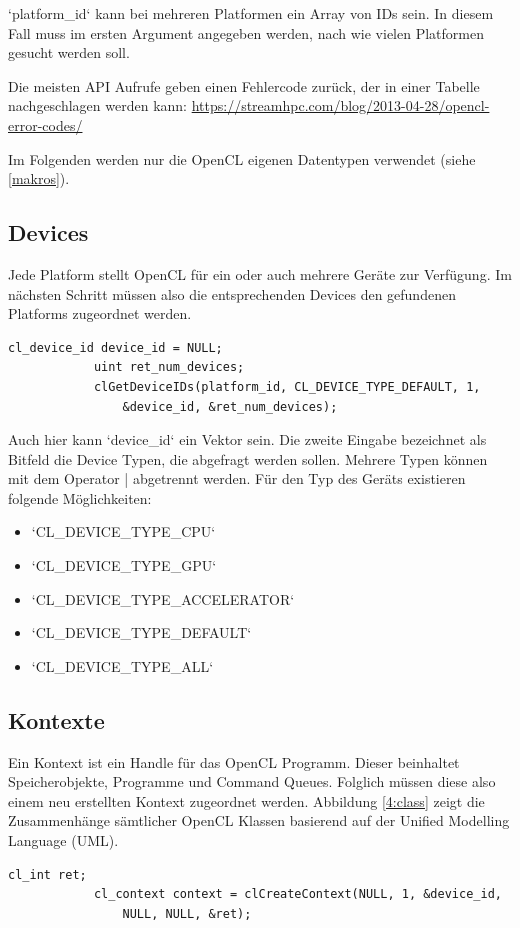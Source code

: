			\li`platform_id` kann bei mehreren Platformen ein Array von IDs sein. In diesem Fall muss im ersten Argument angegeben werden, nach wie vielen Platformen gesucht werden soll.
			
			Die meisten \Gls{API} Aufrufe geben einen Fehlercode zurück, der in einer Tabelle nachgeschlagen werden kann: \url{https://streamhpc.com/blog/2013-04-28/opencl-error-codes/}
			
			Im Folgenden werden nur die OpenCL eigenen Datentypen verwendet (siehe \ref{makros}).
							
			\subsection{Devices}
			Jede \Gls{Platform} stellt OpenCL für ein oder auch mehrere Geräte zur Verfügung. Im nächsten Schritt müssen also die entsprechenden Devices den gefundenen \Glspl{Platform} zugeordnet werden.		
			\begin{lstlisting}[caption=Deviceabfrage]
			cl_device_id device_id = NULL;	
			uint ret_num_devices;
			clGetDeviceIDs(platform_id, CL_DEVICE_TYPE_DEFAULT, 1, 
				&device_id, &ret_num_devices);
			\end{lstlisting}
			
			Auch hier kann \li`device_id` ein Vektor sein. Die zweite Eingabe bezeichnet als Bitfeld die Device Typen, die abgefragt werden sollen. Mehrere Typen können mit dem Operator | abgetrennt werden. Für den Typ des Geräts existieren folgende Möglichkeiten:
						
			\begin{itemize}		
			\item \li`CL_DEVICE_TYPE_CPU`	
			\item \li`CL_DEVICE_TYPE_GPU`		
			\item \li`CL_DEVICE_TYPE_ACCELERATOR`		
			\item \li`CL_DEVICE_TYPE_DEFAULT`			
			\item \li`CL_DEVICE_TYPE_ALL`
			\end{itemize}
				
			\subsection{Kontexte}
			Ein \Gls{Kontext} ist ein \Gls{Handle} für das OpenCL Programm. Dieser beinhaltet Speicherobjekte, Programme und Command Queues. Folglich müssen diese also einem neu erstellten \Gls{Kontext} zugeordnet werden. Abbildung \ref{4:class} zeigt die Zusammenhänge sämtlicher OpenCL Klassen \autocite{oclRC} basierend auf der Unified Modelling Language (UML). \autocite{uml}
			\begin{lstlisting}[caption=Kontexte]
			cl_int ret;
			cl_context context = clCreateContext(NULL, 1, &device_id, 
				NULL, NULL, &ret);	
			\end{lstlisting}
			

